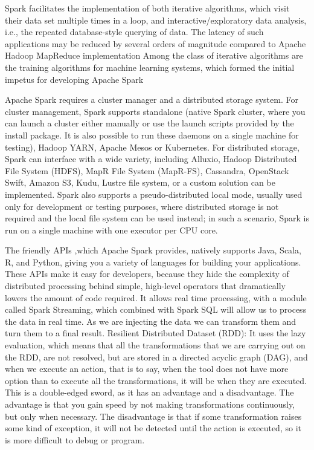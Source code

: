 Spark facilitates the implementation of both iterative algorithms, which visit their data set multiple times in a loop, and interactive/exploratory data analysis, i.e., the repeated database-style querying of data. The latency of such applications may be reduced by several orders of magnitude compared to Apache Hadoop MapReduce implementation Among the class of iterative algorithms are the training algorithms for machine learning systems, which formed the initial impetus for developing Apache Spark

Apache Spark requires a cluster manager and a distributed storage system. For cluster management, Spark supports standalone (native Spark cluster, where you can launch a cluster either manually or use the launch scripts provided by the install package. It is also possible to run these daemons on a single machine for testing), Hadoop YARN, Apache Mesos or Kubernetes. For distributed storage, Spark can interface with a wide variety, including Alluxio, Hadoop Distributed File System (HDFS), MapR File System (MapR-FS), Cassandra, OpenStack Swift, Amazon S3, Kudu, Lustre file system, or a custom solution can be implemented. Spark also supports a pseudo-distributed local mode, usually used only for development or testing purposes, where distributed storage is not required and the local file system can be used instead; in such a scenario, Spark is run on a single machine with one executor per CPU core.\cite{wang2014characterization}

The friendly APIs ,which Apache Spark provides, natively supports Java, Scala, R, and Python, giving you a variety of languages for building your applications. These APIs make it easy for developers, because they hide the complexity of distributed processing behind simple, high-level operators that dramatically lowers the amount of code required.
It allows real time processing, with a module called Spark Streaming, which combined with Spark SQL will allow us to process the data in real time. As we are injecting the data we can transform them and turn them to a final result.
Resilient Distributed Dataset (RDD): It uses the lazy evaluation, which means that all the transformations that we are carrying out on the RDD, are not resolved, but are stored in a directed acyclic graph (DAG), and when we execute an action, that is to say, when the tool does not have more option than to execute all the transformations, it will be when they are executed. This is a double-edged sword, as it has an advantage and a disadvantage. The advantage is that you gain speed by not making transformations continuously, but only when necessary. The disadvantage is that if some transformation raises some kind of exception, it will not be detected until the action is executed, so it is more difficult to debug or program.

